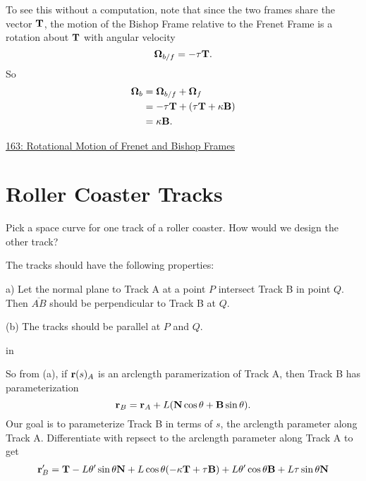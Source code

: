 \documentclass{ximera}
\newcommand{\pskip}{\vskip 0.1 in}
\begin{document}
To see this without a computation, note that since the two frames share the vector ${\bf T}$, the motion of the Bishop Frame relative to the Frenet Frame is a rotation about ${\bf T}$ with angular velocity
\[
      \boldsymbol{\Omega}_{b/f} = -\tau {\bf T}.
\]
So
\begin{align*}
        \boldsymbol{\Omega}_{b} &= \boldsymbol{\Omega}_{b/f}  + \boldsymbol{\Omega}_f   \\
                                                &=     -\tau {\bf T} + (\tau {\bf T} + \kappa {\bf B})  \\
                                                &= \kappa {\bf B} .        
\end{align*}


\begin{exploration}
\begin{onlineOnly}
    \begin{center}
\end{center}
\end{onlineOnly}

\href{https://www.desmos.com/3d/4cjlddpmwd}{163: Rotational Motion of Frenet and Bishop Frames}
\end{exploration}


\section*{Roller Coaster Tracks}
Pick a space curve for one track of a roller coaster. How would we design the other track?

The tracks should have the following properties:

a) Let the normal plane to Track A at a point $P$ intersect Track B in point $Q$. Then $\overline{AB}$ should be perpendicular to Track B at $Q$.

(b) The tracks should be parallel at $P$ and $Q$.

\pskip

So from (a), if ${\bf r}(s)_A$ is an arclength paramerization of Track A, then Track B has parameterization
\[
      {\bf r}_B = {\bf r}_A + L ( {\bf N} \cos\theta  + {\bf B} \sin\theta ) .
\]
Our goal is to parameterize Track B in terms of $s$, the arclength parameter along Track A. 
Differentiate with repsect to the arclength parameter along Track A to get
\begin{align*}
      {\bf r}_B^\prime = {\bf T} -L\theta^\prime \sin\theta {\bf N} + L\cos\theta (-\kappa {\bf T} + \tau {\bf B}) + L\theta^\prime\cos\theta {\bf B} + L\tau \sin\theta {\bf N}
\end{align*}
\end{document}
